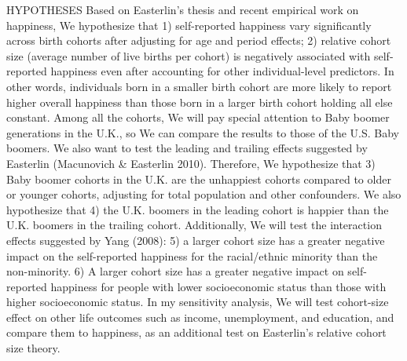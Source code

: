 HYPOTHESES
Based on Easterlin’s thesis and recent empirical work on happiness, We hypothesize that 1) self-reported happiness vary significantly across birth cohorts after adjusting for age and period effects; 2) relative cohort size (average number of live births per cohort) is negatively associated with self-reported happiness even after accounting for other individual-level predictors. In other words, individuals born in a smaller birth cohort are more likely to report higher overall happiness than those born in a larger birth cohort holding all else constant.
Among all the cohorts, We will pay special attention to Baby boomer generations in the U.K., so We can compare the results to those of the U.S. Baby boomers. We also want to test the leading and trailing effects suggested by Easterlin (Macunovich & Easterlin 2010). Therefore, We hypothesize that 3) Baby boomer cohorts in the U.K. are the unhappiest cohorts compared to older or younger cohorts, adjusting for total population and other confounders. We also hypothesize that 4) the U.K. boomers in the leading cohort is happier than the U.K. boomers in the trailing cohort.
Additionally, We will test the interaction effects suggested by Yang (2008): 5) a larger cohort size has a greater negative impact on the self-reported happiness for the racial/ethnic minority than the non-minority. 6) A larger cohort size has a greater negative impact on self-reported happiness for people with lower socioeconomic status than those with higher socioeconomic status. In my sensitivity analysis, We will test cohort-size effect on other life outcomes such as income, unemployment, and education, and compare them to happiness, as an additional test on Easterlin's relative cohort size theory.

